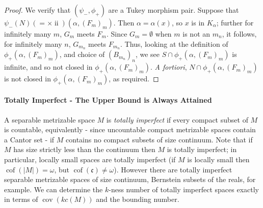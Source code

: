 \documentclass{article}
\DeclareMathOperator{\ii}{ii}
\DeclareMathOperator{\cof}{cof}
\begin{document}
\begin{proof}
    We verify that $(\psi_-,\phi_+)$ are a Tukey morphism pair. 
    Suppose that 
    $
    \psi_-(N) (=\times\ii) (\alpha,(F_m)_m)$. 
    Then $\alpha=\alpha(x)$, so $x$ is in $K_\alpha$; further for infinitely many $m$, $G_m$ meets $F_m$. 
    Since $G_m=\emptyset$ when $m$ is not an $m_n$, it follows, for infinitely many $n$, $G_{m_n}$ meets $F_{m_n}$. Thus, looking at the definition of $\phi_+(\alpha,(F_m)_m)$, and choice of $(B_{m_n})_n$, we see $S \cap \phi_+(\alpha,(F_m)_m)$ is infinite, and so not closed in $\phi_+(\alpha,(F_m)_m)$. \textsl{A fortiori}, $N \cap \phi_+(\alpha,(F_m)_m)$ is not closed in $\phi_+(\alpha,(F_m)_m)$, as required.
\end{proof}






\paragraph{Totally Imperfect - The Upper Bound is Always Attained}

A separable metrizable space $M$ is \emph{totally imperfect} if every compact subset of $M$ is countable, equivalently - since uncountable compact metrizable spaces contain a Cantor set - if $M$ contains no  compact subsets of size continuum. 
Note that if $M$ has size strictly less than the continuum then $M$ is totally imperfect; in particular, locally small spaces are totally imperfect (if $M$ is locally small then $\cof(|M|)=\omega$, but $\cof(\mathfrak{c})\ne\omega$). 
However there are totally imperfect separable metrizable spaces of size continuum, Bernstein subsets of the reals, for example. 
We can determine the $k$-ness number of totally imperfect spaces exactly in terms of $\mathop{cov}(kc(M))$ and the bounding number.
\end{document}
